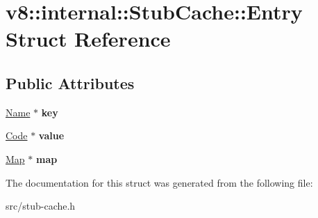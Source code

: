 \hypertarget{structv8_1_1internal_1_1_stub_cache_1_1_entry}{}\section{v8\+:\+:internal\+:\+:Stub\+Cache\+:\+:Entry Struct Reference}
\label{structv8_1_1internal_1_1_stub_cache_1_1_entry}
\subsection*{Public Attributes}
\begin{DoxyCompactItemize}
\item 
\hypertarget{structv8_1_1internal_1_1_stub_cache_1_1_entry_afb66c61baba5124c3e9925fb95eb82ec}{}\hyperlink{classv8_1_1internal_1_1_name}{Name} $\ast$ {\bfseries key}\label{structv8_1_1internal_1_1_stub_cache_1_1_entry_afb66c61baba5124c3e9925fb95eb82ec}

\item 
\hypertarget{structv8_1_1internal_1_1_stub_cache_1_1_entry_ae31a6f7c9bc6e721095dc7a3e4b7c8a2}{}\hyperlink{classv8_1_1internal_1_1_code}{Code} $\ast$ {\bfseries value}\label{structv8_1_1internal_1_1_stub_cache_1_1_entry_ae31a6f7c9bc6e721095dc7a3e4b7c8a2}

\item 
\hypertarget{structv8_1_1internal_1_1_stub_cache_1_1_entry_a439778e1e715dc39104cd6841ceb168a}{}\hyperlink{classv8_1_1internal_1_1_map}{Map} $\ast$ {\bfseries map}\label{structv8_1_1internal_1_1_stub_cache_1_1_entry_a439778e1e715dc39104cd6841ceb168a}

\end{DoxyCompactItemize}


The documentation for this struct was generated from the following file\+:\begin{DoxyCompactItemize}
\item 
src/stub-\/cache.\+h\end{DoxyCompactItemize}
